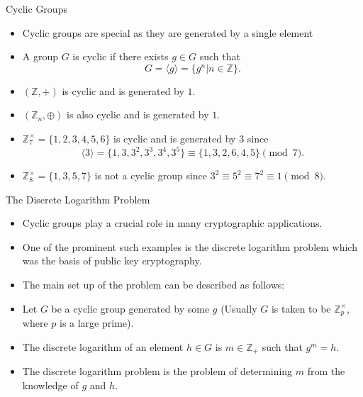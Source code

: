 \documentclass[ %
 10pt, xcolor={dvipsnames,svgnames,x11names,hyperref},
   hyperref={colorlinks=true,citecolor=green,linkcolor=DarkRed,urlcolor=ProcessBlue,anchorcolor=blue}
  ]{beamer}
\newenvironment{stepitemize}{\begin{itemize}[<+->]}{\end{itemize} }
\newcommand{\Z}{\mathbb{Z}}
\begin{document}
\begin{frame}{Cyclic Groups}
    \begin{stepitemize}
    \item Cyclic groups are special as they are generated by a single element
    \item A group $G$ is cyclic if there exists $g\in G$ such that
$$G = \langle g\rangle = \{g^n|n\in \Z\}.$$
\item $(\Z,+)$ is cyclic and is generated by $1$.
    \item $(\Z_n, \oplus)$ is also cyclic and is generated by $1$.
    \item $\Z_7^{\times} = \{1,2,3,4,5,6\}$ is cyclic and is generated by $3$ since
    $$\langle3\rangle = \{1,3,3^2, 3^3, 3^4, 3^5\} \equiv \{1,3,2,6,4,5\} \pmod{7}.$$
    \item $\Z_8^{\times} = \{1,3,5,7\}$ is not a cyclic group since $3^2\equiv 5^2\equiv 7^2\equiv 1 \pmod{8}$.
    \end{stepitemize}
\end{frame}

\begin{frame}{The Discrete Logarithm Problem}
    \begin{stepitemize}
    \item Cyclic groups play a crucial role in many cryptographic applications.
    \item One of the prominent such examples is the discrete logarithm problem which was the basis of public key cryptography.
    \item The main set up of the problem can be described as follows:

\item Let $G$ be a cyclic group generated by some $g$ (Usually $G$ is taken to be $\Z_p^{\times}$, where $p$ is a large prime).
\item The discrete logarithm of an element $h\in G$ is $m\in \Z_+$ such that $g^m=h$.
\item The discrete logarithm problem is the problem of determining $m$ from the knowledge of $g$ and $h$.

    \end{stepitemize}
\end{frame}
\end{document}

